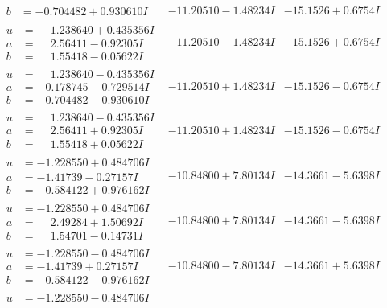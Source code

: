 \documentclass[1p]{elsarticle_modified}
\theoremstyle{definition}
\begin{document}
$$\begin{array}{c|c|c}
\begin{aligned}
b &= -0.704482 + 0.930610 I\end{aligned}
 & -11.20510 - 1.48234 I & -15.1526 + 0.6754 I \\ \hline\begin{aligned}
u &= \phantom{-}1.238640 + 0.435356 I \\
a &= \phantom{-}2.56411 - 0.92305 I \\
b &= \phantom{-}1.55418 - 0.05622 I\end{aligned}
 & -11.20510 - 1.48234 I & -15.1526 + 0.6754 I \\ \hline\begin{aligned}
u &= \phantom{-}1.238640 - 0.435356 I \\
a &= -0.178745 - 0.729514 I \\
b &= -0.704482 - 0.930610 I\end{aligned}
 & -11.20510 + 1.48234 I & -15.1526 - 0.6754 I \\ \hline\begin{aligned}
u &= \phantom{-}1.238640 - 0.435356 I \\
a &= \phantom{-}2.56411 + 0.92305 I \\
b &= \phantom{-}1.55418 + 0.05622 I\end{aligned}
 & -11.20510 + 1.48234 I & -15.1526 - 0.6754 I \\ \hline\begin{aligned}
u &= -1.228550 + 0.484706 I \\
a &= -1.41739 - 0.27157 I \\
b &= -0.584122 + 0.976162 I\end{aligned}
 & -10.84800 + 7.80134 I & -14.3661 - 5.6398 I \\ \hline\begin{aligned}
u &= -1.228550 + 0.484706 I \\
a &= \phantom{-}2.49284 + 1.50692 I \\
b &= \phantom{-}1.54701 - 0.14731 I\end{aligned}
 & -10.84800 + 7.80134 I & -14.3661 - 5.6398 I \\ \hline\begin{aligned}
u &= -1.228550 - 0.484706 I \\
a &= -1.41739 + 0.27157 I \\
b &= -0.584122 - 0.976162 I\end{aligned}
 & -10.84800 - 7.80134 I & -14.3661 + 5.6398 I \\ \hline\begin{aligned}
u &= -1.228550 - 0.484706 I \\

\end{aligned}
\end{array}$$
\end{document}
